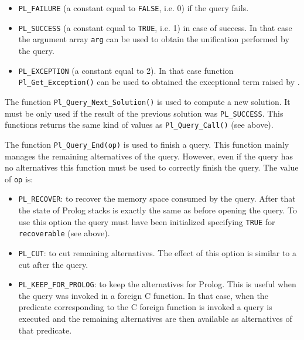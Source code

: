 \begin{itemize}

\item \texttt{PL\_FAILURE} (a constant equal to \texttt{FALSE}, i.e. 0) if
the query fails.

\item \texttt{PL\_SUCCESS} (a constant equal to \texttt{TRUE}, i.e. 1) in
case of success. In that case the argument array \texttt{arg} can be used to
obtain the unification performed by the query.

\item \texttt{PL\_EXCEPTION} (a constant equal to 2). In that case function
\texttt{Pl\_Get\_Exception()} can be used to obtained the exceptional term
raised by  .

\end{itemize}

The function \texttt{Pl\_Query\_Next\_Solution()} is used to compute a new
solution. It must be only used if the result of the previous solution was
\texttt{PL\_SUCCESS}. This functions returns the same kind of values as
\texttt{Pl\_Query\_Call()} (see above).

The function \texttt{Pl\_Query\_End(op)} is used to finish a query. This
function mainly manages the remaining alternatives of the query. However,
even if the query has no alternatives this function must be used to
correctly finish the query. The value of \texttt{op} is:

\begin{itemize}

\item \texttt{PL\_RECOVER}: to recover the memory space consumed by the
query. After that the state of Prolog stacks is exactly the same as before
opening the query. To use this option the query must have been initialized
specifying \texttt{TRUE} for \texttt{recoverable} (see above).

\item \texttt{PL\_CUT}: to cut remaining alternatives. The effect of this
option is similar to a cut after the query.

\item \texttt{PL\_KEEP\_FOR\_PROLOG}: to keep the alternatives for Prolog.
This is useful when the query was invoked in a foreign C function. In that
case, when the predicate corresponding to the C foreign function is invoked
a query is executed and the remaining alternatives are then available as
alternatives of that predicate.

\end{itemize}

